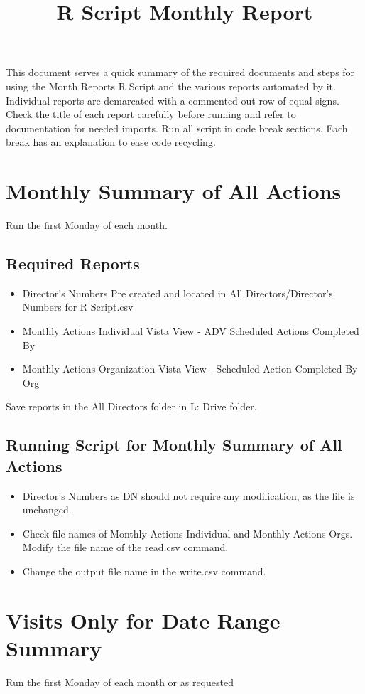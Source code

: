 \documentclass{article}
\title{R Script Monthly Report}
\date{}
\begin{document}
\maketitle
This document serves a quick summary of the required documents and steps for using the Month Reports R Script and the various reports automated by it. Individual reports are demarcated with a commented out row of equal signs. Check the title of each report carefully before running and refer to documentation for needed imports. Run all script in code break sections. Each break has an explanation to ease code recycling.
\section{Monthly Summary of All Actions}
Run the first Monday of each month.
\subsection{Required Reports}
\begin{itemize}
	\item Director's Numbers 
	\subitem Pre created and located in All Directors/Director's Numbers for R Script.csv
	\item Monthly Actions Individual
	\subitem Vista View - ADV Scheduled Actions Completed By
	\item Monthly Actions Organization
	\subitem Vista View - Scheduled Action Completed By Org
\end{itemize}
Save reports in the All Directors folder in L: Drive folder. 
\subsection{Running Script for Monthly Summary of All Actions}
\begin{itemize}
	\item Director's Numbers as DN should not require any modification, as the file is unchanged.
	\item Check file names of Monthly Actions Individual and Monthly Actions Orgs. Modify the file name of the read.csv command. 
	\item Change the output file name in the write.csv command. 
\end{itemize}

\section{Visits Only for Date Range Summary}
Run the first Monday of each month or as requested
\end{document}
